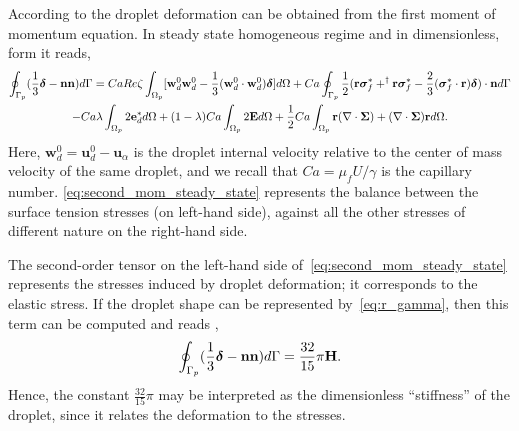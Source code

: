 According to \citet[Eq. 5.32 ]{fintzi2025averaged} the droplet deformation can be obtained from the first moment of momentum equation. 
In steady state homogeneous regime and in dimensionless, form it reads, 
\begin{multline}
    \intS[p]{ (\frac{1}{3}\bm\delta - \textbf{nn})}
    =
    Ca Re \zeta\intO[p]{
        [\textbf{w}_d^0  \textbf{w}_d^0 
        -\frac{1}{3} (\textbf{w}_d^0 \cdot  \textbf{w}_d^0) \bm\delta]
    }
    +Ca \intS[p]{\frac{1}{2}(\textbf{r}\bm\sigma_f^*+^\dagger\textbf{r}\bm\sigma_f^*-\frac{2}{3}(\bm\sigma_f^* \cdot \textbf{r})\bm\delta)\cdot \textbf{n}}\\
    - Ca\lambda\intO[p]{2 \textbf{e}_d^*} 
    + (1-\lambda)Ca\intO[p]{2\textbf{E}} 
    + \frac{1}{2}Ca\intO[p]{\textbf{r}(\div\bm\Sigma)+ (\div\bm\Sigma) \textbf{r}}.
    \label{eq:second_mom_steady_state}
\end{multline}
Here, $\textbf{w}_d^0 = \textbf{u}_d^0 - \textbf{u}_\alpha$ is the droplet internal  velocity relative to the center of mass velocity of the same droplet, and we recall that $Ca = \mu_f U/\gamma$ is the capillary number. 
\ref{eq:second_mom_steady_state} represents the balance between the surface tension stresses (on left-hand side), against all the other stresses of different nature on the right-hand side. 

The second-order tensor on the left-hand side of~\ref{eq:second_mom_steady_state} represents the stresses induced by droplet deformation; it corresponds to the elastic stress.
If the droplet shape can be represented by~\ref{eq:r_gamma}, then this term can be computed and reads \citep{lhuillier1987phenomenology},
\begin{equation}
    \intS[p]{ (\frac{1}{3}\bm\delta - \textbf{nn})}
    =
    \frac{32}{15} \pi \textbf{H}.
    \label{eq:def_H}
\end{equation}
Hence, the constant $\tfrac{32}{15}\pi$ may be interpreted as the dimensionless ``stiffness'' of the droplet, since it relates the deformation to the stresses. 

